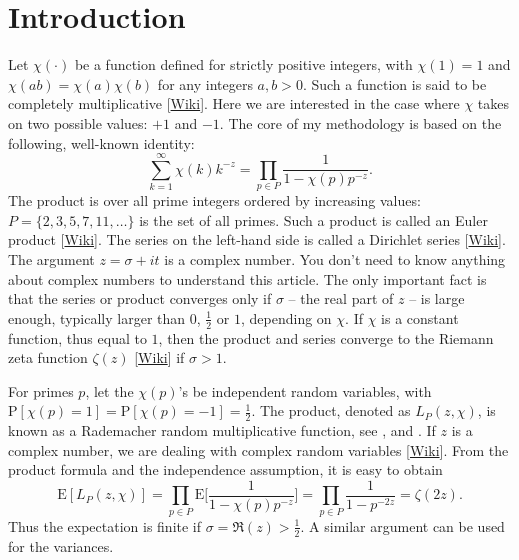 \documentclass[oneside,10pt]{book}
\begin{document}
\hypersetup{linkcolor=red}

\section{Introduction}\label{pivizintro}

Let $\chi(\cdot)$ be a function defined for strictly positive integers, with $\chi(1)=1$ and $\chi(ab)=\chi(a)\chi(b)$ for
any integers $a,b>0$. Such a function is said to be
\textcolor{index}{completely multiplicative} [\href{https://en.wikipedia.org/wiki/Completely_multiplicative_function}{Wiki}].
Here we are interested in the case where $\chi$ takes on two possible values: $+1$ and $-1$. The core of my methodology is based on the following, well-known identity:
\begin{equation}
\sum_{k=1}^\infty \chi(k) k^{-z} = \prod_{p\in P} \frac{1}{1-\chi(p) p^{-z}}.\label{bore}
\end{equation}
The product is over all prime integers ordered by increasing values: $P=\{2,3,5,7,11,\dots\}$ is the set of all primes. Such a product is called an \textcolor{index}{Euler product} [\href{https://en.wikipedia.org/wiki/Euler_product}{Wiki}]. The series on the left-hand side is called
a \textcolor{index}{Dirichlet series} [\href{https://en.wikipedia.org/wiki/Dirichlet_series}{Wiki}]. The argument $z=\sigma+it$ is a complex number. You don't need to know anything about complex numbers to understand this article. The only important fact is that the series or product converges only if $\sigma$ -- the real part of $z$ -- is large enough, typically larger than $0$, $\frac{1}{2}$ or $1$, depending on $\chi$. If $\chi$ is a constant function, thus equal to $1$, then the product and series converge to the
 \textcolor{index}{Riemann zeta function} $\zeta(z)$ [\href{https://en.wikipedia.org/wiki/Riemann_zeta_function}{Wiki}] if $\sigma>1$.

For primes $p$,  let the $\chi(p)$'s be independent random variables, with $\text{P}[\chi(p)=1] =  \text{P}[\chi(p)=-1] =\frac{1}{2}$.
The product, denoted as $L_P(z,\chi)$, is known as a \textcolor{index}{Rademacher random multiplicative function}, see \cite{harper2020bb}, \cite{harper2020} and \cite{yukkam2013}. If $z$ is a complex number, we are dealing with
 \textcolor{index}{complex random variables} [\href{https://en.wikipedia.org/wiki/Complex_random_variable}{Wiki}]. From the product formula and the independence assumption, it is easy to obtain
\begin{equation}
\text{E} [L_P(z,\chi)]=\prod_{p\in P} \text{E}\bigg[\frac{1}{1-\chi(p)p^{-z}}\bigg]=\prod_{p\in P }\frac{1}{1-p^{-2z}}=\zeta(2z).\label{proofrn}
\end{equation}
Thus the expectation is finite if $\sigma=\Re(z)>\frac{1}{2}$. A similar argument can be used for the variances.
\end{document}
